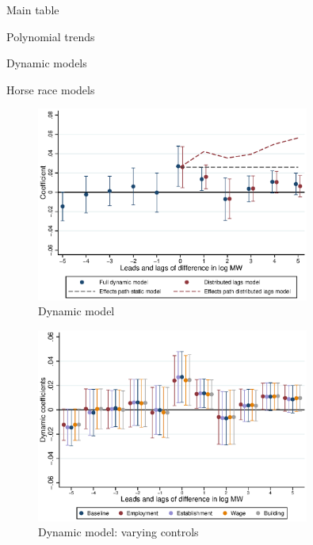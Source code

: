 \documentclass{article}
\begin{document}
\begin{table}[h!] \centering
   \caption{Main table}
   
\end{table}

\begin{table}[h!] \centering
	\caption{Polynomial trends}
	
\end{table}

\clearpage
\begin{table}[h!] \centering
	\caption{Dynamic models}
	
\end{table}


\clearpage
\begin{table}[h!] \centering
	\caption{Horse race models}
	\resizebox{\textwidth}{!}{
		
	}
\end{table}

\clearpage
\begin{figure} \centering
	\caption{Dynamic model}
	\includegraphics[width = 0.8\textwidth]{../../analysis/first_differences/output/fd_models.eps}
\end{figure}


\begin{figure} \centering
	\caption{Dynamic model: varying controls}
	\includegraphics[width = 0.8\textwidth]{../../analysis/first_differences/output/fd_models_control.eps}
\end{figure}
   
\end{document}
